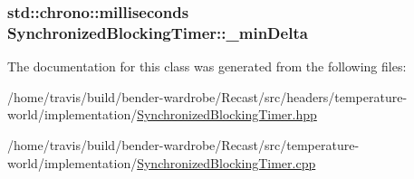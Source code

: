 \hypertarget{class_synchronized_blocking_timer_a61a45cf02dfe6a18392f493459d98790}{
\subsubsection[{\-\_\-min\-Delta}]{\setlength{\rightskip}{0pt plus 5cm}std\-::chrono\-::milliseconds Synchronized\-Blocking\-Timer\-::\-\_\-min\-Delta\hspace{0.3cm}{\ttfamily [protected]}}}\label{class_synchronized_blocking_timer_a61a45cf02dfe6a18392f493459d98790}


The documentation for this class was generated from the following files\-:\begin{DoxyCompactItemize}
\item 
/home/travis/build/bender-\/wardrobe/\-Recast/src/headers/temperature-\/world/implementation/\hyperlink{_synchronized_blocking_timer_8hpp}{Synchronized\-Blocking\-Timer.\-hpp}\item 
/home/travis/build/bender-\/wardrobe/\-Recast/src/temperature-\/world/implementation/\hyperlink{_synchronized_blocking_timer_8cpp}{Synchronized\-Blocking\-Timer.\-cpp}\end{DoxyCompactItemize}
